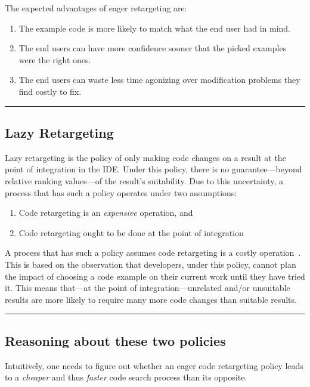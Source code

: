 The expected advantages of eager retargeting are:

\begin{enumerate}
	\item The example code is more likely to match what the end user had in mind.
	\item The end users can have more confidence sooner that the picked examples were the right ones.
	\item The end users can waste less time agonizing over modification problems they find costly to fix. 
\end{enumerate}


\fancybreak{\pfbreakdisplay}

\subsection{Lazy Retargeting}

Lazy retargeting is the policy of only making code changes on a result at the point of integration in the IDE. Under this policy, there is no guarantee---beyond relative ranking values---of the result's suitability. Due to this uncertainty, a process that has such a policy operates under two assumptions:

\begin{enumerate}
	\item Code retargeting is an \emph{expensive} operation, and
	\item Code retargeting ought to be done at the point of integration
\end{enumerate}

A process that has such a policy assumes code retargeting is a costly operation~\cite{Brandt:2009ew, Wightman:2012gc}. This is based on the observation that developers, under this policy, cannot plan the impact of choosing a code example on their current work until they have tried it. This means that---at the point of integration---unrelated and/or unsuitable results are more likely to require many more code changes than suitable results.

\fancybreak{\pfbreakdisplay}

\subsection{Reasoning about these two policies}

Intuitively, one needs to figure out whether an eager code retargeting policy leads to a \emph{cheaper} and thus \emph{faster} code search process than its opposite. 

